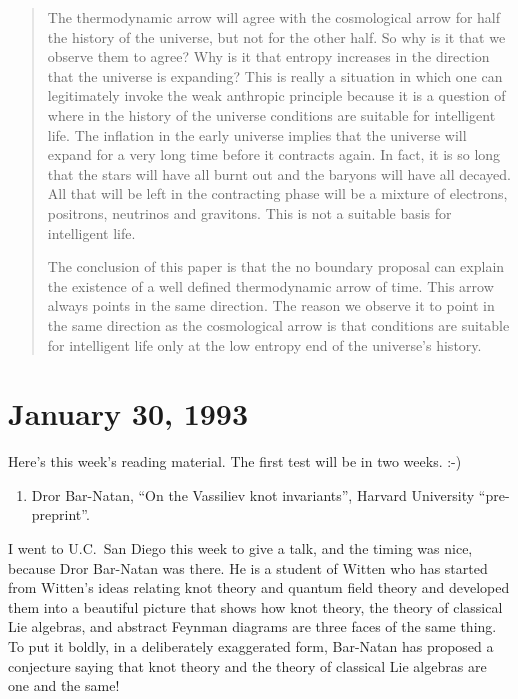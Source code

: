 \documentclass{article}
\def\tightlist{}
\begin{document}
\begin{quote}

The thermodynamic arrow will agree with the cosmological arrow for half
the history of the universe, but not for the other half. So why is it
that we observe them to agree? Why is it that entropy increases in the
direction that the universe is expanding? This is really a situation in
which one can legitimately invoke the weak anthropic principle because
it is a question of where in the history of the universe conditions are
suitable for intelligent life. The inflation in the early universe
implies that the universe will expand for a very long time before it
contracts again. In fact, it is so long that the stars will have all
burnt out and the baryons will have all decayed. All that will be left
in the contracting phase will be a mixture of electrons, positrons,
neutrinos and gravitons. This is not a suitable basis for intelligent
life.

The conclusion of this paper is that the no boundary proposal can
explain the existence of a well defined thermodynamic arrow of time.
This arrow always points in the same direction. The reason we observe it
to point in the same direction as the cosmological arrow is that
conditions are suitable for intelligent life only at the low entropy end
of the universe's history.
\end{quote}



\hypertarget{week3}{%
\section{January 30, 1993}\label{week3}}

Here's this week's reading material. The first test will be in two
weeks. :-)

\begin{enumerate}
\def\labelenumi{\arabic{enumi})}
\tightlist
\item
   Dror Bar-Natan, ``On the Vassiliev knot invariants'', Harvard
  University ``pre-preprint''.
\end{enumerate}

I went to U.C.\ San Diego this week to give a talk, and the timing was
nice, because Dror Bar-Natan was there. He is a student of Witten who
has started from Witten's ideas relating knot theory and quantum field
theory and developed them into a beautiful picture that shows how knot
theory, the theory of classical Lie algebras, and abstract Feynman
diagrams are three faces of the same thing. To put it boldly, in a
deliberately exaggerated form, Bar-Natan has proposed a conjecture
saying that knot theory and the theory of classical Lie algebras are one
and the same!
\end{document}
